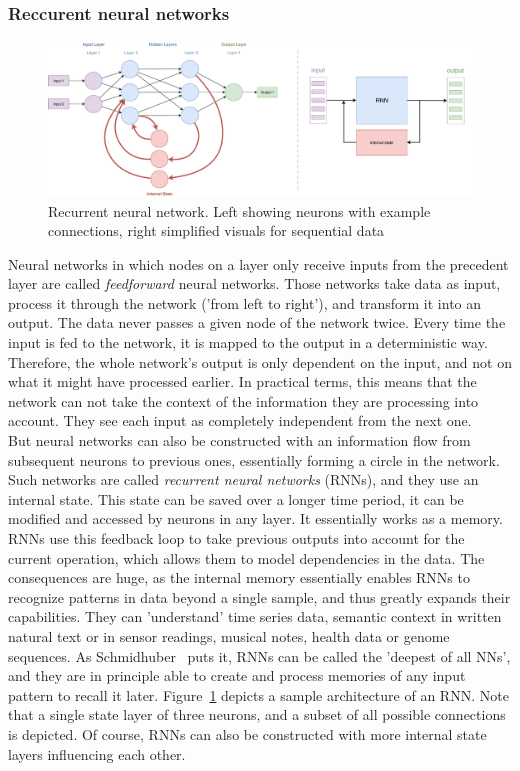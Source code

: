 \documentclass[
a4paper,
pagesize,
pdftex,
12pt,
twoside, %
BCOR=5mm, %
ngerman,
fleqn,
final,
]{scrartcl}
\begin{document}
	\subsubsection{Reccurent neural networks}\label{RNN}
	\begin{figure}[ht]
		\centering
		\includegraphics[width=\linewidth]{img/RecurrentNeuralNetwork}
		\caption{Recurrent neural network. Left showing neurons with example connections, right simplified visuals for sequential data}
		\label{fig:rnn}
	\end{figure}
	Neural networks in which nodes on a layer only receive inputs from the precedent layer are called \textit{feedforward} neural networks. Those networks take data as input, process it through the network ('from left to right'), and transform it into an output. The data never passes a given node of the network twice. Every time the input is fed to the network, it is mapped to the output in a deterministic way. Therefore, the whole network's output is only dependent on the input, and not on what it might have processed earlier. In practical terms, this means that the network can not take the context of the information they are processing into account. They see each input as completely independent from the next one.\\
	But neural networks can also be constructed with an information flow from subsequent neurons to previous ones, essentially forming a circle in the network. Such networks are called \textit{recurrent neural networks} (RNNs), and they use an internal state. This state can be saved over a longer time period, it can be modified and accessed by neurons in any layer. It essentially works as a memory. RNNs use this feedback loop to take previous outputs into account for the current operation, which allows them to model dependencies in the data. The consequences are huge, as the internal memory essentially enables RNNs to recognize patterns in data beyond a single sample, and thus greatly expands their capabilities. They can 'understand' time series data, semantic context in written natural text or in sensor readings, musical notes, health data or genome sequences. As Schmidhuber~\cite{Schmidhuber.2015} puts it, RNNs can be called the 'deepest of all NNs', and they are in principle able to create and process memories of any input pattern to recall it later. Figure~\ref{fig:rnn} depicts a sample architecture of an RNN. Note that a single state layer of three neurons, and a subset of all possible connections is depicted. Of course, RNNs can also be constructed with more internal state layers influencing each other.\\
\end{document}
